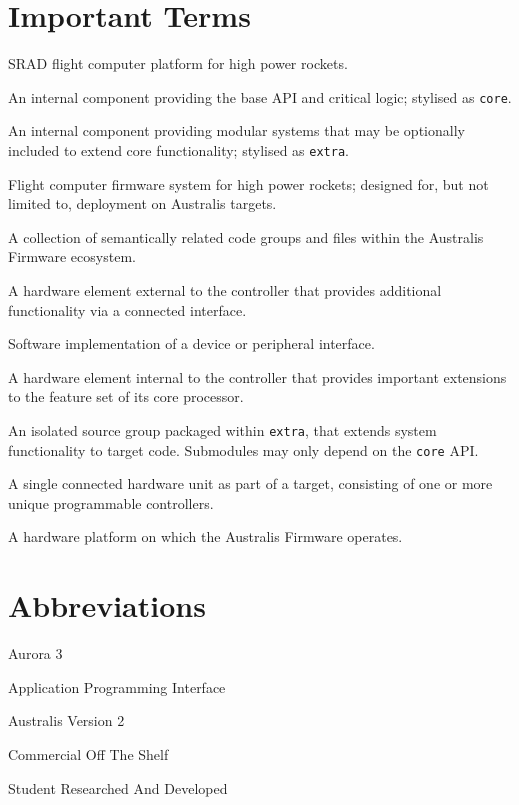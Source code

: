 \pagestyle{ruled}

\section*{Important Terms}
\begin{description}[leftmargin=8em,style=multiline]
    \item[Australis] SRAD flight computer platform for high power rockets.
    \item[Australis Core] An internal component providing the base API and critical logic; stylised as \verb|core|.
    \item[Australis Extra] An internal component providing modular systems that may be optionally included to extend core functionality; stylised as \verb|extra|.
    \item[Australis Firmware] Flight computer firmware system for high power rockets; designed for, but not limited to, deployment on Australis targets.
    \item[Component] A collection of semantically related code groups and files within the Australis Firmware ecosystem.
    \item[Device] A hardware element external to the controller that provides additional functionality via a connected interface.
    \item[Driver] Software implementation of a device or peripheral interface.
    \item[Peripheral] A hardware element internal to the controller that provides important extensions to the feature set of its core processor.
    \item[Submodule] An isolated source group packaged within \verb|extra|, that extends system functionality to target code. Submodules may only depend on the \verb|core| API.
    \item[Subtarget] A single connected hardware unit as part of a target, consisting of one or more unique programmable controllers.
    \item[Target] A hardware platform on which the Australis Firmware operates.
\end{description}

\section*{Abbreviations}
\begin{description}[leftmargin=4em,style=multiline]
    \item[A3\footnotemark] Aurora 3
    \item[API] Application Programming Interface
    \item[AV2] Australis Version 2
    \item[COTS] Commercial Off The Shelf
    \item[SRAD] Student Researched And Developed
\end{description}

